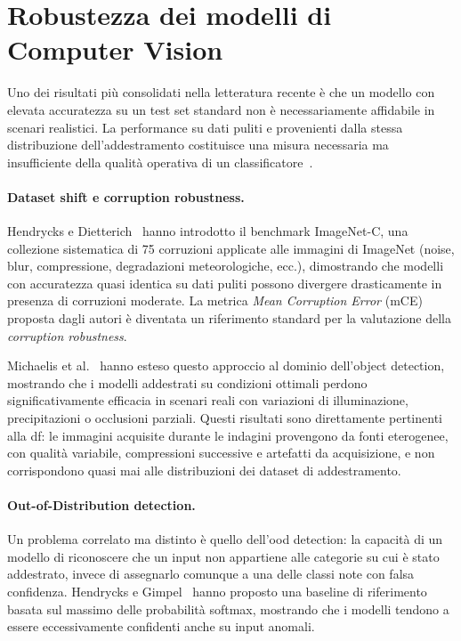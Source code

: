\section{Robustezza dei modelli di Computer Vision}
\label{sec:robustness}

Uno dei risultati più consolidati nella letteratura recente è che un modello con elevata accuratezza su un test set standard non è necessariamente affidabile in scenari realistici. La performance su dati puliti e provenienti dalla stessa distribuzione dell'addestramento costituisce una misura necessaria ma insufficiente della qualità operativa di un classificatore~\cite{hendrycks2019benchmarking}.

\paragraph{Dataset shift e corruption robustness.}
Hendrycks e Dietterich~\cite{hendrycks2019benchmarking} hanno introdotto il benchmark ImageNet-C, una collezione sistematica di 75 corruzioni applicate alle immagini di ImageNet (noise, blur, compressione, degradazioni meteorologiche, ecc.), dimostrando che modelli con accuratezza quasi identica su dati puliti possono divergere drasticamente in presenza di corruzioni moderate. La metrica \textit{Mean Corruption Error} (mCE) proposta dagli autori è diventata un riferimento standard per la valutazione della \textit{corruption robustness}.

Michaelis et al.~\cite{michaelis2019winter} hanno esteso questo approccio al dominio dell'object detection, mostrando che i modelli addestrati su condizioni ottimali perdono significativamente efficacia in scenari reali con variazioni di illuminazione, precipitazioni o occlusioni parziali. Questi risultati sono direttamente pertinenti alla \gls{df}: le immagini acquisite durante le indagini provengono da fonti eterogenee, con qualità variabile, compressioni successive e artefatti da acquisizione, e non corrispondono quasi mai alle distribuzioni dei dataset di addestramento.

\paragraph{Out-of-Distribution detection.}
Un problema correlato ma distinto è quello dell'\gls{ood} detection: la capacità di un modello di riconoscere che un input non appartiene alle categorie su cui è stato addestrato, invece di assegnarlo comunque a una delle classi note con falsa confidenza. Hendrycks e Gimpel~\cite{hendrycks2017baseline} hanno proposto una baseline di riferimento basata sul massimo delle probabilità softmax, mostrando che i modelli tendono a essere eccessivamente confidenti anche su input anomali.

